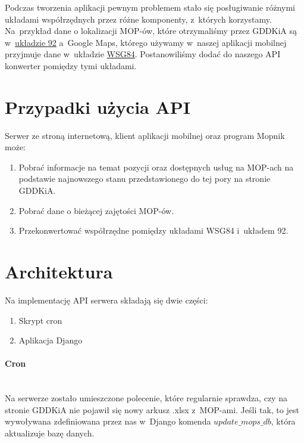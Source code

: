 Podczas tworzenia aplikacji pewnym problemem stało się posługiwanie różnymi układami współrzędnych przez różne komponenty, z~których korzystamy. Na~przykład dane o lokalizacji MOP-ów, które otrzymaliśmy przez GDDKiA są w~\href{https://pl.wikipedia.org/wiki/Uk\%C5\%82ad_wsp\%C3\%B3\%C5\%82rz\%C4\%99dnych_1992}{układzie 92} a~Google Maps, którego używamy w~naszej aplikacji mobilnej przyjmuje dane w~układzie \href{https://pl.wikipedia.org/wiki/System_odniesienia_WGS_84}{WSG84}. Postanowiliśmy dodać do naszego API konwerter pomiędzy tymi układami.
\section{Przypadki użycia API}
Serwer ze stroną internetową, klient aplikacji mobilnej oraz program Mopnik może:
\begin{enumerate}
\item Pobrać informacje na temat pozycji oraz dostępnych usług na MOP-ach na podstawie najnowszego stanu przedstawionego do tej pory na stronie GDDKiA.
\item Pobrać dane o bieżącej zajętości MOP-ów.
\item Przekonwertować współrzędne pomiędzy układami WSG84 i~układem 92\cite{uklad-92}.
\end{enumerate}
\section{Architektura}
Na implementację API serwera składają się dwie części:
\begin{enumerate}
\item Skrypt cron
\item Aplikacja Django
\end{enumerate}
\paragraph{Cron}\mbox{}\\
Na serwerze zostało umieszczone polecenie, które regularnie sprawdza, czy na stronie GDDKiA nie pojawił się nowy arkusz .xlsx z~MOP-ami. Jeśli tak, to jest wywoływana zdefiniowana przez nas w~Django komenda $\textit{update\_mops\_db}$, która aktualizuje bazę danych.
